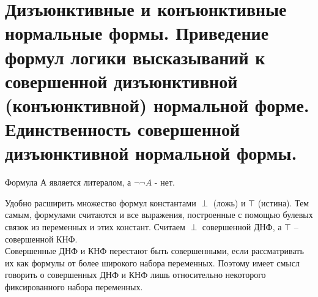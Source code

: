 \section{Дизъюнктивные и конъюнктивные нормальные формы. Приведение формул логики высказываний к совершенной
дизъюнктивной (конъюнктивной) нормальной форме. Единственность совершенной дизъюнктивной
нормальной формы.}

\begin{example}
	Формула А является литералом, а $ \neg\neg A$ - нет.
\end{example}



\begin{remark} 
	Удобно расширить множество формул константами
	$\perp$ (ложь) и $\top$ (истина). Тем самым, формулами считаются и все выражения, построенные с помощью булевых
	связок из переменных и этих констант. Считаем $\perp$ совершенной ДНФ, а $\top$ -- совершенной КНФ.\\
	Совершенные ДНФ и КНФ перестают быть совершенными, если рассматривать их как формулы от более широкого набора
	переменных. Поэтому имеет смысл говорить о совершенных ДНФ и КНФ лишь относительно некоторого фиксированного
	набора переменных.
\end{remark}

